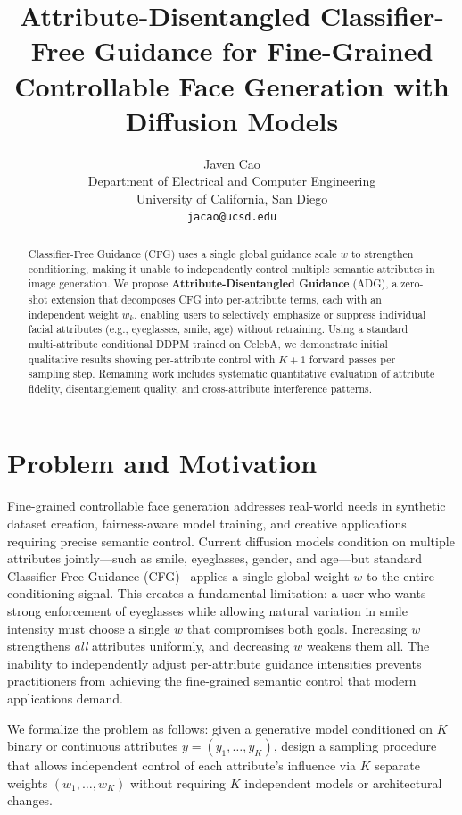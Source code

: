 \documentclass{article}
\title{Attribute-Disentangled Classifier-Free Guidance for Fine-Grained Controllable Face Generation with Diffusion Models}
\author{%
  Javen Cao \\
  Department of Electrical and Computer Engineering \\
  University of California, San Diego \\
  \texttt{jacao@ucsd.edu}
}
\begin{document}
\maketitle

\vspace{-1.0em}

\begin{abstract}
Classifier-Free Guidance (CFG) uses a single global guidance scale $w$ to strengthen conditioning, making it unable to independently control multiple semantic attributes in image generation. We propose \textbf{Attribute-Disentangled Guidance} (ADG), a zero-shot extension that decomposes CFG into per-attribute terms, each with an independent weight $w_k$, enabling users to selectively emphasize or suppress individual facial attributes (e.g., eyeglasses, smile, age) without retraining. Using a standard multi-attribute conditional DDPM trained on CelebA, we demonstrate initial qualitative results showing per-attribute control with $K{+}1$ forward passes per sampling step. Remaining work includes systematic quantitative evaluation of attribute fidelity, disentanglement quality, and cross-attribute interference patterns.
\end{abstract}

\section{Problem and Motivation}
\label{sec:intro}

Fine-grained controllable face generation addresses real-world needs in synthetic dataset creation, fairness-aware model training, and creative applications requiring precise semantic control. Current diffusion models condition on multiple attributes jointly—such as smile, eyeglasses, gender, and age—but standard Classifier-Free Guidance (CFG)~\citep{ho2022cfg} applies a single global weight $w$ to the entire conditioning signal. This creates a fundamental limitation: a user who wants strong enforcement of eyeglasses while allowing natural variation in smile intensity must choose a single $w$ that compromises both goals. Increasing $w$ strengthens \emph{all} attributes uniformly, and decreasing $w$ weakens them all. The inability to independently adjust per-attribute guidance intensities prevents practitioners from achieving the fine-grained semantic control that modern applications demand.

We formalize the problem as follows: given a generative model conditioned on $K$ binary or continuous attributes $y = (y_1, \ldots, y_K)$, design a sampling procedure that allows independent control of each attribute's influence via $K$ separate weights $(w_1, \ldots, w_K)$ without requiring $K$ independent models or architectural changes.
\end{document}

